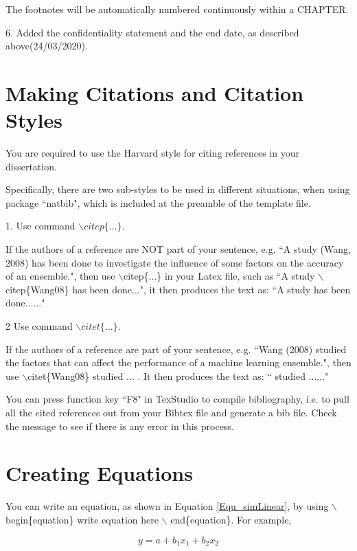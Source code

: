 The footnotes will be automatically numbered continuously within a CHAPTER. 

6. Added the confidentiality statement and the end date, as described above(24/03/2020).  


\section {Making Citations and Citation Styles}

You are required to use the Harvard style for citing references in your dissertation.

Specifically, there are two sub-styles to be used in different situations, when using package ``natbib", which is included at the preamble of the template file.

1. Use command $\backslash citep\{...\}$. 

If the authors of a reference are NOT part of your sentence, e.g. ``A study (Wang, 2008) has been done to investigate the influence of some factors on the accuracy of an ensemble.", then use $\backslash$citep\{...\} in your Latex file, such as ``A study $\backslash$citep\{Wang08\} has been done...", it then produces the text as: 
``A study \citep{Wang08} has been done......"

2 Use command $\backslash citet\{...\}$.

If the authors of a reference are part of your sentence, e.g. ``Wang (2008) studied the factors that can affect the performance of a machine learning ensemble.", then use $\backslash$citet\{Wang08\} studied ... . It then produces the text as: `` \citet{Wang08} studied ......" 
  
You can press function key ``F8" in TexStudio to compile bibliography, i.e. to pull all the cited references out from your Bibtex file and generate a bib file. Check the message to see if there is any error in this process.       

\section{Creating Equations}

You can write an equation, as shown in Equation \ref{Equ_simLinear}, by using $\backslash$begin\{equation\} write equation here $\backslash$ end\{equation\}. For example, 

\begin{equation}
\label{Equ_simLinear}
y = a + b_1x_1 + b_2x_2
\end{equation}


